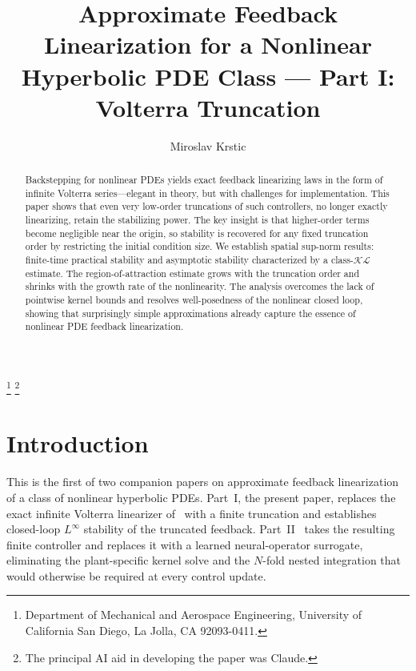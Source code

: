 \documentclass[amsthm]{autart}
\theoremstyle{plain}
\theoremstyle{definition}
\newcommand{\Linf}{L^\infty}
\begin{document}
\begin{frontmatter}

\title{
Approximate Feedback Linearization for a Nonlinear Hyperbolic PDE Class --- Part I: Volterra Truncation}

\author{Miroslav Krstic}
\thanks{Department of Mechanical and Aerospace Engineering, University of California San Diego, La Jolla, CA 92093-0411.}
\thanks{The principal AI aid in developing the paper was Claude.}

\begin{abstract}
Backstepping for nonlinear PDEs yields exact feedback linearizing laws in the form of infinite Volterra series---elegant in theory, but with challenges for implementation. This paper shows that even very low-order truncations of such controllers, no longer exactly linearizing, retain the stabilizing power. The key insight is that higher-order terms become negligible near the origin, so stability is recovered for any fixed truncation order by restricting the initial condition size. We establish spatial sup-norm results: finite-time practical stability and asymptotic stability characterized by a class-$\mathcal{KL}$ estimate. The region-of-attraction estimate grows with the truncation order and shrinks with the growth rate of the nonlinearity. The analysis overcomes the lack of pointwise kernel bounds and resolves well-posedness of the nonlinear closed loop, showing that surprisingly simple approximations already capture the essence of nonlinear PDE feedback linearization.
\end{abstract}

\date{}
\end{frontmatter}

\section{Introduction}\label{sec:intro}

This is the first of two companion papers on approximate feedback linearization of a class of nonlinear hyperbolic PDEs. Part~I, the present paper, replaces the exact infinite Volterra linearizer of~\cite{krstic2026feedbacklinearizationhyperbolicpdes} with a finite truncation and establishes closed-loop $\Linf$ stability of the truncated feedback. Part~II~\cite{krstic2026feedbacklinearizationhyperbolicpdes-NO} takes the resulting finite controller and replaces it with a learned neural-operator surrogate, eliminating the plant-specific kernel solve and the $N$-fold nested integration that would otherwise be required at every control update.
\end{document}
